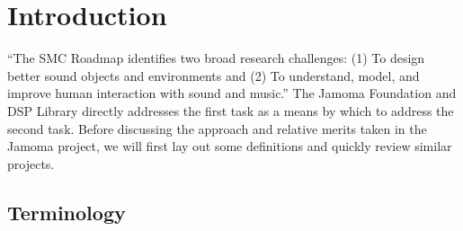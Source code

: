 \documentclass[twoside,10pt]{article}
\affiliation{}{}
\title{\papertitle}
\begin{document}
\sloppy
{} %
    
\maketitle


\begin{abstract}

This paper presents an object-oriented, reflective, application programming interface for C++, with an emphasis on real-time signal processing. 
The Jamoma Foundation and DSP Library provide a flexible framework and runtime environment, as well as an expanding collection of unit generators for synthesis, processing, and analysis.  It makes use of polymorphic typing, dynamic binding, and introspection to create a cross-platform environment pulling ideas from languages such as Smalltalk and Objective-C while remaining within the bounds of the portable and cross-platform C++ context. 
This library has been used in both open source and commercial software projects over the past several years.

\end{abstract}


\section{Introduction} %
\label{sec:introduction}

``The SMC Roadmap identifies two broad research challenges: (1) To design better sound objects and environments and (2) To understand, model, and improve human interaction with sound and music.'' \cite{serra:2007}  The Jamoma Foundation and DSP Library directly addresses the first task as a means by which to address the second task.  Before discussing the approach and relative merits taken in the Jamoma project, we will first lay out some definitions and quickly review similar projects.


\subsection{Terminology} %
\end{document}
